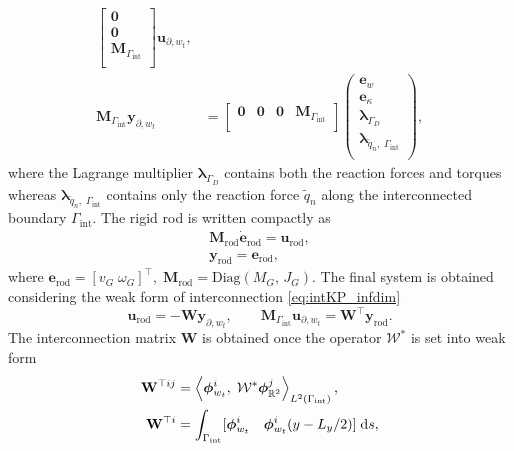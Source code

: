 \begin{equation}
\begin{aligned}
\begin{bmatrix}
\mathbf{0}\\
\mathbf{0}\\
\mathbf{M}_{\Gamma_{\mathrm{int}}}\\
\end{bmatrix}\mathbf{u}_{\partial, w_t}, \\
\mathbf{M}_{\Gamma_{\mathrm{int}}}\mathbf{y}_{\partial, w_t}
&= \begin{bmatrix}
\mathbf{0} &  \mathbf{0} &  \mathbf{0} & \mathbf{M}_{\Gamma_{\mathrm{int}}} \\
\end{bmatrix}
\begin{pmatrix}
{\mathbf{e}}_{w} \\
{\mathbf{e}}_{\kappa} \\
{\bm{\lambda}}_{\Gamma_D} \\
{\bm{\lambda}}_{\widetilde{q}_n, \; \Gamma_{\mathrm{int}}} \\
\end{pmatrix},
\end{aligned}
\end{equation}
where the Lagrange multiplier ${\bm{\lambda}}_{\Gamma_D}$ contains both the reaction forces and torques whereas ${\bm{\lambda}}_{\widetilde{q}_n, \; \Gamma_{\mathrm{int}}}$ contains only the reaction force $\widetilde{q}_n$ along the interconnected boundary $\Gamma_{\mathrm{int}}$. The rigid rod is written compactly as
\begin{equation}
\begin{aligned}
\mathbf{M}_{\mathrm{rod}} \dot{\mathbf{e}}_{\mathrm{rod}} = \mathbf{u}_{\mathrm{rod}}, \\
\mathbf{y}_{\mathrm{rod}} = \mathbf{e}_{\mathrm{rod}},
\end{aligned}
\end{equation}
where $\mathbf{e}_{\mathrm{rod}} = [v_G \;  \omega_{G}]^\top, \; \bm{M}_{\text{rod}} = \mathrm{Diag}(M_G, \, J_G)$. The final system is obtained considering the weak form of interconnection \eqref{eq:intKP_infdim}
\begin{equation}\label{eq:intKP_findim}
\mathbf{u}_{\mathrm{rod}} = - \mathbf{W} \mathbf{y}_{\partial, w_t}, \qquad \mathbf{M}_{\Gamma_{\mathrm{int}}} \mathbf{u}_{\partial, w_t} = \mathbf{W}^\top \mathbf{y}_{\mathrm{rod}}.
\end{equation} 
The interconnection matrix $\mathbf{W}$ is obtained once the operator $\mathcal{W}^*$ is set into weak form
\begin{align*}
\mathbf{W}^{\top ij} &= \left\langle \bm{\phi}^i_{w_t}, \; \mathcal{W}^* \bm{\phi}^j_{\mathbb{R}^2} \right\rangle_{L^2(\Gamma_{\text{int}})}, \\
\mathbf{W}^{\top i} &= \int_{\Gamma_{\text{int}}} [\bm{\phi}^i_{w_t} \quad \bm{\phi}^i_{w_t} (y - L_y/2) ]\d{s},
\end{align*}
